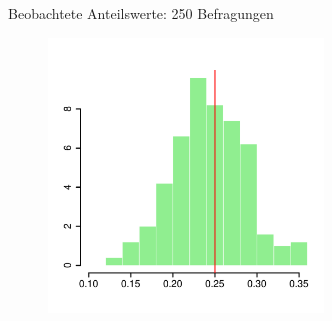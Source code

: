 \documentclass[usenames,dvipsnames,handout]{beamer}
\begin{document}
\begin{frame}{Beobachtete Anteilswerte: 250 Befragungen}
  \begin{figure}[ht]
 	\centering
 	      \includegraphics[width=0.65\textwidth]{prob_est250.pdf}%
 	\end{figure}
\end{frame}
\end{document}
